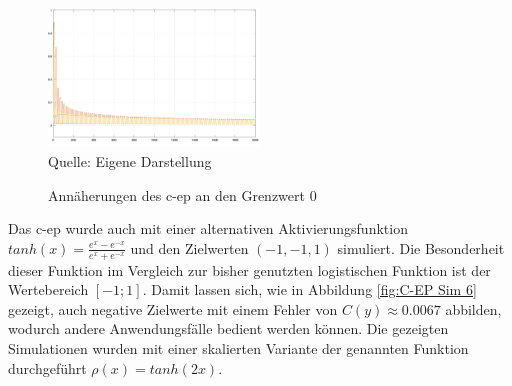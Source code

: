\begin{figure}[h]
  \label{fig:C-EP Sim 5}
  \caption{Annäherungen des \ac{c-ep} an den Grenzwert \(0\)}
  \centering
  \includegraphics[width=0.5\textwidth]{abbildungen/c_ep_sim_5_ausgabe.png}
  \\
  Quelle: Eigene Darstellung
\end{figure}

Das \ac{c-ep} wurde auch mit einer alternativen Aktivierungsfunktion \(tanh(x)=\frac{e^x-e^{-x}}{e^x+e^{-x}}\) und den Zielwerten \((-1,-1,1)\) simuliert. Die Besonderheit dieser Funktion im Vergleich zur bisher genutzten logistischen Funktion ist der Wertebereich \([-1;1]\). Damit lassen sich, wie in Abbildung \ref{fig:C-EP Sim 6} gezeigt, auch negative Zielwerte mit einem Fehler von \(C(y)\approx0.0067\) abbilden, wodurch andere Anwendungsfälle bedient werden können. Die gezeigten Simulationen wurden mit einer skalierten Variante der genannten Funktion durchgeführt \(\rho(x)=tanh(2x)\).

